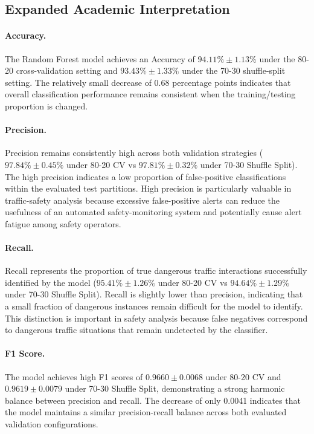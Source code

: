 \subsection{Expanded Academic Interpretation}

\paragraph{Accuracy.}
The Random Forest model achieves an Accuracy of $94.11\% \pm 1.13\%$ under the 80-20 cross-validation setting and $93.43\% \pm 1.33\%$ under the 70-30 shuffle-split setting. The relatively small decrease of 0.68 percentage points indicates that overall classification performance remains consistent when the training/testing proportion is changed.

\paragraph{Precision.}
Precision remains consistently high across both validation strategies ($97.84\% \pm 0.45\%$ under 80-20 CV vs $97.81\% \pm 0.32\%$ under 70-30 Shuffle Split). The high precision indicates a low proportion of false-positive classifications within the evaluated test partitions. High precision is particularly valuable in traffic-safety analysis because excessive false-positive alerts can reduce the usefulness of an automated safety-monitoring system and potentially cause alert fatigue among safety operators.

\paragraph{Recall.}
Recall represents the proportion of true dangerous traffic interactions successfully identified by the model ($95.41\% \pm 1.26\%$ under 80-20 CV vs $94.64\% \pm 1.29\%$ under 70-30 Shuffle Split). Recall is slightly lower than precision, indicating that a small fraction of dangerous instances remain difficult for the model to identify. This distinction is important in safety analysis because false negatives correspond to dangerous traffic situations that remain undetected by the classifier.

\paragraph{F1 Score.}
The model achieves high F1 scores of $0.9660 \pm 0.0068$ under 80-20 CV and $0.9619 \pm 0.0079$ under 70-30 Shuffle Split, demonstrating a strong harmonic balance between precision and recall. The decrease of only 0.0041 indicates that the model maintains a similar precision-recall balance across both evaluated validation configurations.

